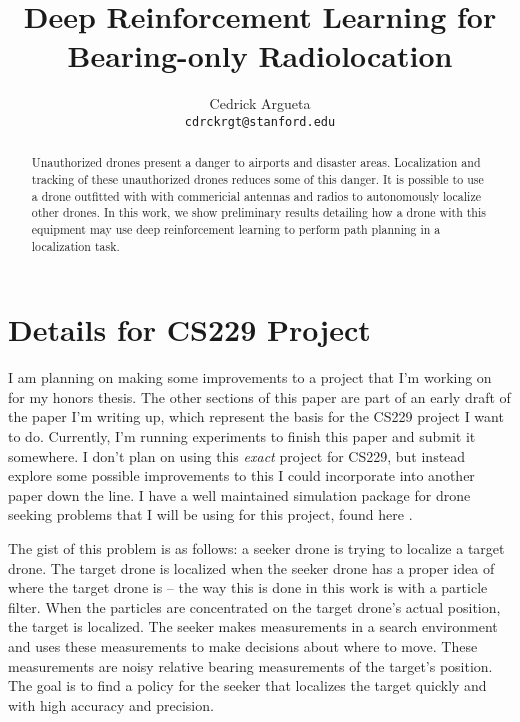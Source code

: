 \documentclass[10pt,twocolumn,letterpaper]{article}
\begin{document}
\title{Deep Reinforcement Learning for Bearing-only Radiolocation}

\author{Cedrick Argueta \\
{\tt\small cdrckrgt@stanford.edu}
}

\maketitle

\begin{abstract}
Unauthorized drones present a danger to airports and disaster areas.
Localization and tracking of these unauthorized drones reduces some of this danger.
It is possible to use a drone outfitted with with commericial antennas and radios to autonomously localize other drones.
In this work, we show preliminary results detailing how a drone with this equipment may use deep reinforcement learning to perform path planning in a localization task.
\end{abstract}

\section{Details for CS229 Project}
I am planning on making some improvements to a project that I'm working on for my honors thesis.
The other sections of this paper are part of an early draft of the paper I'm writing up, which represent the basis for the CS229 project I want to do.
Currently, I'm running experiments to finish this paper and submit it somewhere.
I don't plan on using this \textit{exact} project for CS229, but instead explore some possible improvements to this I could incorporate into another paper down the line.
I have a well maintained simulation package for drone seeking problems that I will be using for this project, found here \cite{PyFEBOL}.

The gist of this problem is as follows: a seeker drone is trying to localize a target drone.
The target drone is localized when the seeker drone has a proper idea of where the target drone is -- the way this is done in this work is with a particle filter.
When the particles are concentrated on the target drone's actual position, the target is localized.
The seeker makes measurements in a search environment and uses these measurements to make decisions about where to move.
These measurements are noisy relative bearing measurements of the target's position.
The goal is to find a policy for the seeker that localizes the target quickly and with high accuracy and precision.
\end{document}
